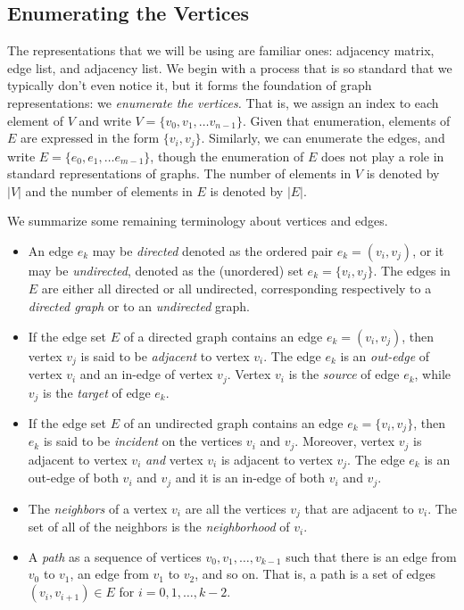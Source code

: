 \subsection{Enumerating the Vertices}

The representations that we will be using are familiar ones: adjacency matrix, edge list, and adjacency list.
We begin with a process that is so standard that we typically don't even notice it, but it forms
the foundation of graph representations: we \emph{enumerate the vertices.}  That is, we assign an
index to each element of $V$ and write $V = \{v_0, v_1, \ldots v_{n-1}\}$.  Given that enumeration,
elements of $E$ are expressed in the form $\{v_i, v_j\}$.  Similarly, we can enumerate the edges, and write  
$E = \{ e_0, e_1, \ldots e_{m-1}\}$, though the enumeration of $E$ does not play a role in standard
representations of graphs.
%
The number of elements in $V$ is denoted by $|V|$ and the number of elements in $E$ is denoted by $|E|$.

We summarize some remaining terminology about vertices and edges.
\begin{itemize}
\item 
An edge $e_k$ may  be \emph{directed} denoted as the ordered pair $e_k=(v_i, v_j)$, or it may be
  \emph{undirected}, denoted as the (unordered) set $e_k=\{v_i, v_j\}$.  The edges 
in $E$ are either all directed or all undirected,
  corresponding respectively to a \emph{directed graph} or to an \emph{undirected} graph.
\item 
If the edge set $E$ of a directed graph contains an edge $e_k = (v_i,v_j)$, then
  vertex $v_j$ is said to be \emph{adjacent} to vertex $v_i$.  The edge $e_k$ is an
  \emph{out-edge} of vertex $v_i$ and an in-edge of vertex $v_j$.  Vertex $v_i$ is the \emph{source} of
  edge $e_k$, while $v_j$ is the \emph{target} of edge $e_k$.
\item If the edge set $E$ of an undirected graph contains an edge $e_k = \{v_i,v_j\}$, then
  $e_k$ is said to be \emph{incident} on the vertices $v_i$ and $v_j$.
  Moreover, vertex $v_j$ is adjacent to vertex $v_i$
  \emph{and} vertex $v_i$ is adjacent to vertex $v_j$.
  The edge $e_k$ is an out-edge of both $v_i$ and $v_j$ and it is an in-edge of both $v_i$ and $v_j$.
\item The \emph{neighbors} of a vertex $v_i$ are all the vertices $v_j$ that are adjacent to $v_i$.  The set of all of the neighbors is the \emph{neighborhood} of $v_i$.
\item A \emph{path} as a sequence of vertices $v_0, v_1, \ldots, v_{k-1}$ such that
there is an edge from $v_0$ to $v_1$, an edge from $v_1$ to $v_2$, and so on.
That is, a path is a set of edges $(v_i, v_{i+1}) \in E$ for  $i = 0, 1, \ldots, k-2$.
\end{itemize}

